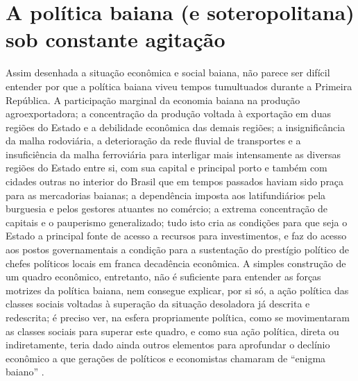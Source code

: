 \section{A política baiana (e soteropolitana) sob constante agitação}\label{sec:1.3}

Assim desenhada a situação econômica e social baiana, não parece ser difícil entender por que a política baiana viveu tempos tumultuados durante a Primeira República. A participação marginal da economia baiana na produção agroexportadora; a concentração da produção voltada à exportação em duas regiões do Estado e a debilidade econômica das demais regiões; a insignificância da malha rodoviária, a deterioração da rede fluvial de transportes e a insuficiência da malha ferroviária para interligar mais intensamente as diversas regiões do Estado entre si, com sua capital e principal porto e também com cidades outras no interior do Brasil que em tempos passados haviam sido praça para as mercadorias baianas; a dependência imposta aos latifundiários pela burguesia e pelos gestores atuantes no comércio; a extrema concentração de capitais e o pauperismo generalizado; tudo isto cria as condições para que seja o Estado a principal fonte de acesso a recursos para investimentos, e faz do acesso aos postos governamentais a condição para a sustentação do prestígio político de chefes políticos locais em franca decadência econômica. A simples construção de um quadro econômico, entretanto, não é suficiente para entender as forças motrizes da política baiana, nem consegue explicar, por si só, a ação política das classes sociais voltadas à superação da situação desoladora já descrita e redescrita; é preciso ver, na esfera propriamente política, como se movimentaram as classes sociais para superar este quadro, e como sua ação política, direta ou indiretamente, teria dado ainda outros elementos para aprofundar o declínio econômico a que gerações de políticos e economistas chamaram de ``enigma baiano'' \cite{AGUIAR1958}.

